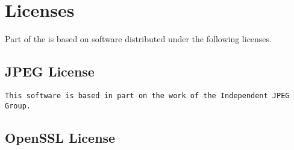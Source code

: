 
\chapter{Licenses}
\label{sec:licenses}

Part of the \usdk is based on software distributed under the
following licenses.


\section{JPEG License}

\begin{lstlisting}[language={},basicstyle={\ttfamily\footnotesize}]
This software is based in part on the work of the Independent JPEG Group.
\end{lstlisting}

\section{OpenSSL License}



